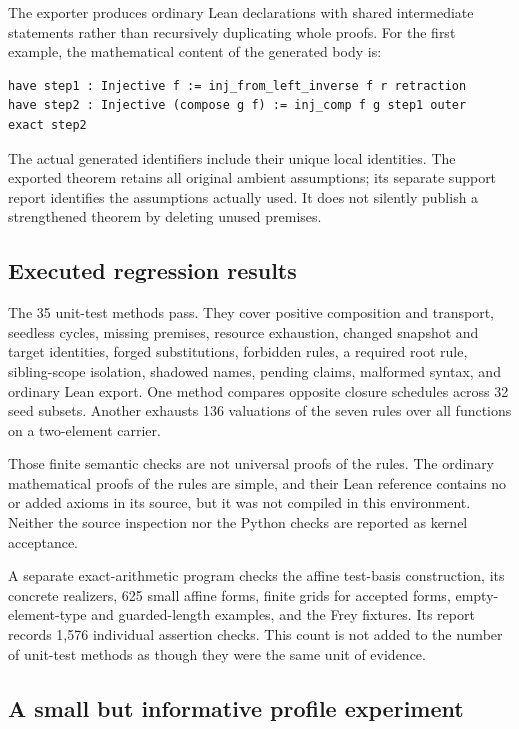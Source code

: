 \documentclass[11pt,a4paper]{article}
\newcommand{\code}[1]{\texttt{\detokenize{#1}}}
\theoremstyle{definition}
\theoremstyle{remark}
\begin{document}
The exporter produces ordinary Lean declarations with shared intermediate
\code{have} statements rather than recursively duplicating whole proofs.
For the first example, the mathematical content of the generated body is:
\begin{lstlisting}
have step1 : Injective f := inj_from_left_inverse f r retraction
have step2 : Injective (compose g f) := inj_comp f g step1 outer
exact step2
\end{lstlisting}
The actual generated identifiers include their unique local identities. The
exported theorem retains all original ambient assumptions; its separate support
report identifies the assumptions actually used. It does not silently publish
a strengthened theorem by deleting unused premises.

\subsection{Executed regression results}

The 35 unit-test methods pass. They cover positive composition and transport,
seedless cycles, missing premises, resource exhaustion, changed snapshot and
target identities, forged substitutions, forbidden rules, a required root
rule, sibling-scope isolation, shadowed names, pending claims, malformed
syntax, and ordinary Lean export. One method compares opposite closure
schedules across 32 seed subsets. Another exhausts 136 valuations of the seven
rules over all functions on a two-element carrier.

Those finite semantic checks are not universal proofs of the rules. The
ordinary mathematical proofs of the rules are simple, and their Lean reference
contains no \code{sorry} or added axioms in its source, but it was not compiled
in this environment. Neither the source inspection nor the Python checks are
reported as kernel acceptance.

A separate exact-arithmetic program checks the affine test-basis construction,
its concrete realizers, 625 small affine forms, finite grids for accepted forms,
empty-element-type and guarded-length examples, and the Frey fixtures.
Its report records 1,576 individual assertion checks. This count is not added
to the number of unit-test methods as though they were the same unit of evidence.

\subsection{A small but informative profile experiment}
\end{document}
